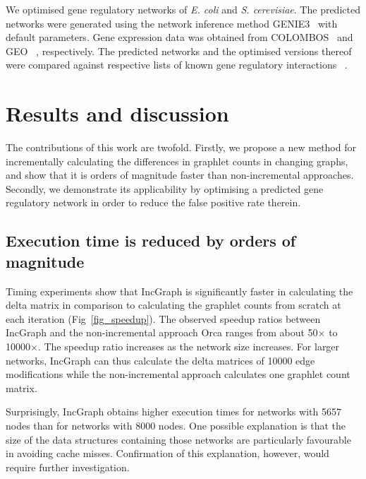 We optimised gene regulatory networks of \textit{E. coli} and \textit{S. cerevisiae}. The predicted networks were generated using the network inference method GENIE3~ \cite{huynh-thu_inferringregulatorynetworks_2010} with default parameters. Gene expression data was obtained from COLOMBOS~ \cite{moretto_colombosv3leveraging_2016} and GEO~ \cite{edgar_geneexpressionomnibus_2002}, respectively. The predicted networks and the optimised versions thereof were compared against respective lists of known gene regulatory interactions~ \cite{gama-castro_regulondbversionhighlevel_2016,ma_denovolearninggenomescale_2014}.

\section*{Results and discussion}
The contributions of this work are twofold. Firstly, we propose a new method for incrementally calculating the differences in graphlet counts in changing graphs, and show that it is orders of magnitude faster than non-incremental approaches. Secondly, we demonstrate its applicability by optimising a predicted gene regulatory network in order to reduce the false positive rate therein.

\subsection*{Execution time is reduced by orders of magnitude}
Timing experiments show that IncGraph is significantly faster in calculating the delta matrix in comparison to calculating the graphlet counts from scratch at each iteration (Fig~\ref{fig_speedup}). The observed speedup ratios between IncGraph and the non-incremental approach Orca ranges from about 50$\times$ to 10000$\times$. The speedup ratio increases as the network size increases. For larger networks, IncGraph can thus calculate the delta matrices of 10000 edge modifications while the non-incremental approach calculates one graphlet count matrix.

Surprisingly, IncGraph obtains higher execution times for networks with 5657 nodes than for networks with 8000 nodes. One possible explanation is that the size of the data structures containing those networks are particularly favourable in avoiding cache misses. Confirmation of this explanation, however, would require further investigation.



